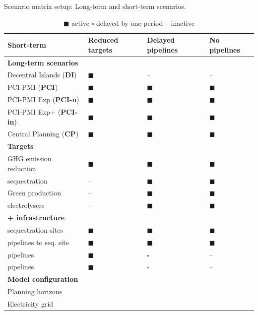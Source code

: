 \documentclass[preprint,12pt,sort&compress]{elsarticle}
\begin{document}
\begin{table}[htbp]
  \centering
  \caption{Scenario matrix setup: Long-term and short-term scenarios.}
  \label{tab:scenarios}
  \scriptsize
  \begin{tabularx}{\textwidth}{R{3.9cm}>{\centering\arraybackslash}X>{\centering\arraybackslash}X>{\centering\arraybackslash}X}
    \toprule
    \textbf{Short-term} & \textbf{Reduced targets} & \textbf{Delayed pipelines} & \textbf{No pipelines} \\
    \midrule
    \textbf{Long-term scenarios} & & & \\
    Decentral Islands (\textbf{DI}) & $\blacksquare$ & -- & -- \\
    PCI-PMI (\textbf{PCI}) & $\blacksquare$ & $\blacksquare$ & $\blacksquare$ \\
    PCI-PMI Exp (\textbf{PCI-n}) & $\blacksquare$ & $\blacksquare$ & $\blacksquare$\\
    PCI-PMI Exp+ (\textbf{PCI-in}) & $\blacksquare$ & $\blacksquare$ & $\blacksquare$ \\
    Central Planning (\textbf{CP}) & $\blacksquare$ & $\blacksquare$ & $\blacksquare$ \\
    \midrule
    \textbf{Targets} & & & \\
    GHG emission reduction &  $\blacksquare$ &  $\blacksquare$ &  $\blacksquare$ \\
     sequestration &  -- &  $\blacksquare$ &  $\blacksquare$ \\
    Green  production &  -- &  $\blacksquare$ &  $\blacksquare$ \\
     electrolysers &  -- &  $\blacksquare$ &  $\blacksquare$ \\
    \midrule
    \textbf{ +  infrastructure} & & & \\
     sequestration sites & $\blacksquare$ &  $\blacksquare$ &  $\blacksquare$ \\
     pipelines to seq. site & $\blacksquare$ &  $\blacksquare$ &  $\blacksquare$ \\
     pipelines & $\blacksquare$ &  $\square$ &  -- \\
     pipelines & $\blacksquare$ &  $\square$ &  -- \\
    \midrule
    \textbf{Model configuration} & & & \\
    Planning horizons &   \\
    Electricity grid &  \\

    \bottomrule
  \end{tabularx}
  \caption*{\scriptsize $\blacksquare$ active \quad $\square$ delayed by one period \quad -- inactive}
\end{table}
\end{document}
